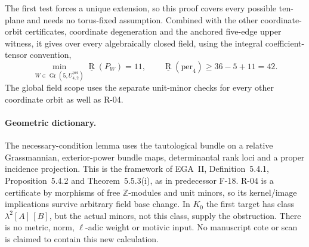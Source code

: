 The first test forces a unique extension, so this proof
covers every possible ten-plane and needs no torus-fixed
assumption. Combined with the other coordinate-orbit
certificates, coordinate degeneration and the anchored
five-edge upper witness, it gives over every algebraically closed field, using the integral coefficient-tensor convention,
\[
 \min_{W\in\operatorname{Gr}(5,U_{4,2}^{\mathrm{per}})}
     \underline{\operatorname R}(P_W)=11,\qquad
 \underline{\operatorname R}(\mathrm{per}_4)\geq36-5+11=42.
\]
The global field scope uses the separate unit-minor checks for every other coordinate orbit as well as R-04.

\paragraph{Geometric dictionary.}
The necessary-condition lemma uses the tautological bundle on a relative Grassmannian,
exterior-power bundle maps, determinantal rank loci and a
proper incidence projection. This is the framework of
EGA~II, Definition~5.4.1, Proposition~5.4.2 and
Theorem~5.5.3(i), as in predecessor F-18.
R-04 is a certificate by morphisms of free $\mathbb Z$-modules
and unit minors, so its kernel/image implications survive
arbitrary field base change. In $K_0$ the first target has
class $\lambda^2[A]\,[B]$, but the actual minors, not this
class, supply the obstruction. There is no metric, norm,
$\ell$-adic weight or motivic input. No manuscript cote or
scan is claimed to contain this new calculation.
